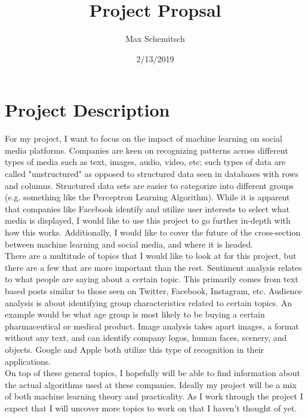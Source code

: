 \documentclass[a4paper]{article}
\title{Project Propsal}
\author{Max Schemitsch}
\date{2/13/2019}
\begin{document}
\lstset{language=Python}

\maketitle

\section{Project Description}

For my project, I want to focus on the impact of machine learning on social media platforms. Companies are keen on recognizing patterns across different types of media such as text, images, audio, video, etc; such types of data are called "unstructured" as opposed to structured data seen in databases with rows and columns. Structured data sets are easier to categorize into different groups (e.g. something like the Perceptron Learning Algorithm). While it is apparent that companies like Facebook identify and utilize user interests to select what media is displayed, I would like to use this project to go further in-depth with how this works. Additionally, I would like to cover the future of the cross-section between machine learning and social media, and where it is headed.
\\

There are a multitude of topics that I would like to look at for this project, but there are a few that are more important than the rest. Sentiment analysis relates to what people are saying about a certain topic. This primarily comes from text based posts similar to those seen on Twitter, Facebook, Instagram, etc. Audience analysis is about identifying group characteristics related to certain topics. An example would be what age group is most likely to be buying a certain pharmaceutical or medical product. Image analysis takes apart images, a format without any text, and can identify company logos, human faces, scenery, and objects. Google and Apple both utilize this type of recognition in their applications.
\\

On top of these general topics, I hopefully will be able to find information about the actual algorithms used at these companies. Ideally my project will be a mix of both machine learning theory and practicality. As I work through the project I expect that I will uncover more topics to work on that I haven't thought of yet.
\end{document}
